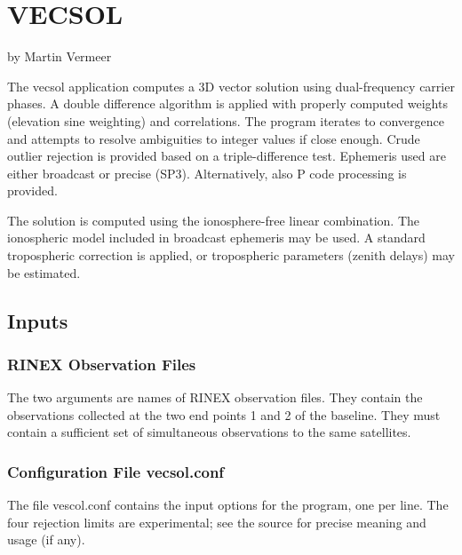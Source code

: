 \chapter{VECSOL}
by Martin Vermeer
       
The vecsol application computes a  3D vector solution using dual-frequency carrier phases. A double difference algorithm is applied with properly computed weights (elevation sine weighting)  and  correlations. The  program  iterates to convergence and attempts to resolve ambiguities to integer values if close enough.  Crude  outlier  rejection  is  provided  based  on  a  triple-difference  test. Ephemeris used are either broadcast or precise (SP3). Alternatively, also P code processing is provided.

       The solution is computed using the ionosphere-free linear combination.  The ionospheric  model included in broadcast ephemeris may be used. A standard tropospheric correction is applied, or tropospheric parameters (zenith delays) may be estimated.

\section{Inputs}

\subsection{RINEX Observation Files}
The two arguments are names of RINEX observation files. They contain the observations 
collected at the two end points 1 and 2 of the baseline.  They
must contain a sufficient set of simultaneous observations to the same satellites.

\subsection{Configuration File vecsol.conf}
The file vescol.conf contains the input options for the program, one per line. 
The four rejection limits are experimental; see the source for precise meaning and usage (if any).

